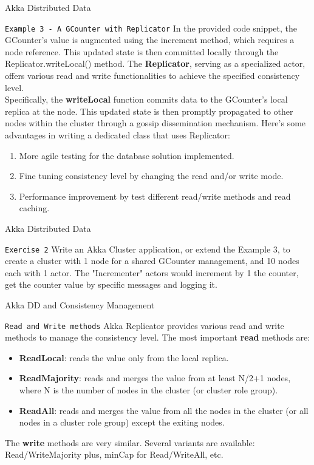 \documentclass[presentation,apice]{beamer}\mode<presentation>{\usetheme{AMSBolognaFC}}
\begin{document}
\begin{frame}[c,fragile]{Akka Distributed Data}
\begin{block}{\texttt{Example 3 - A GCounter with Replicator}}
In the provided code snippet, the GCounter's value is augmented using the increment method, which requires a node reference. This updated state is then committed locally through the Replicator.writeLocal() method. The \textbf{Replicator}, serving as a specialized actor, offers various read and write functionalities to achieve the specified consistency level. \\Specifically, the \textbf{writeLocal} function commits data to the GCounter's local replica at the node. This updated state is then promptly propagated to other nodes within the cluster through a gossip dissemination mechanism. Here's some advantages in writing a dedicated class that uses Replicator:
\begin{enumerate}
    \item More agile testing for the database solution implemented.
    \item Fine tuning consistency level by changing the read and/or write mode.
    \item Performance improvement by test different read/write methods and read caching.
\end{enumerate}
\end{block}
%
\end{frame}
\begin{frame}[c,fragile]{Akka Distributed Data}
\begin{block}{\texttt{Exercise 2}}
Write an Akka Cluster application, or extend the Example 3, to create a cluster with 1 node for a shared GCounter management, and 10 nodes each with 1 actor. The "Incrementer" actors would increment by 1 the counter, get the counter value by specific messages and logging it.
\end{block}
%
\end{frame}

\begin{frame}[c,fragile]{Akka DD and Consistency Management}
\begin{block}{\texttt{Read and Write methods}}
Akka Replicator provides various read and write methods to manage the consistency level. The most important \textbf{read} methods are:
\begin{itemize}
    \item \textbf{ReadLocal}: reads the value only from the local replica.
    \item \textbf{ReadMajority}: reads and merges the value from at least N/2+1 nodes, where N is the number of nodes in the cluster (or cluster role group).
    \item \textbf{ReadAll}: reads and merges the value from all the nodes in the cluster (or all nodes in a cluster role group) except the exiting nodes.
\end{itemize}
The \textbf{write} methods are very similar. 
Several variants are available: Read/WriteMajority plus, minCap for Read/WriteAll, etc.
\end{block}
\end{frame}
\end{document}
